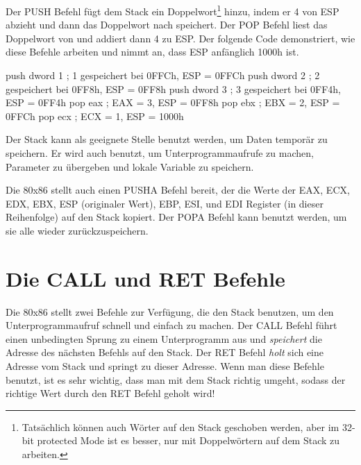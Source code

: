 Der {\code PUSH} Befehl f\"{u}gt dem Stack ein
Doppelwort\footnote{Tats\"{a}chlich k\"{o}nnen auch W\"{o}rter auf den Stack
geschoben werden, aber im 32-bit protected Mode ist es besser, nur
mit Doppelw\"{o}rtern auf dem Stack zu arbeiten.} hinzu, indem er 4 von
ESP abzieht und dann das Doppelwort nach {\code [ESP]} speichert.
Der {\code POP} Befehl liest das Doppelwort von {\code [ESP]} und
addiert dann 4 zu ESP\@. Der folgende Code demonstriert, wie diese
Befehle arbeiten und nimmt an, dass ESP anf\"{a}nglich {\code 1000h}
ist.
\begin{AsmCodeListing}[frame=none, numbers=left]
      push   dword 1        ; 1 gespeichert bei 0FFCh, ESP = 0FFCh
      push   dword 2        ; 2 gespeichert bei 0FF8h, ESP = 0FF8h
      push   dword 3        ; 3 gespeichert bei 0FF4h, ESP = 0FF4h
      pop    eax            ; EAX = 3, ESP = 0FF8h
      pop    ebx            ; EBX = 2, ESP = 0FFCh
      pop    ecx            ; ECX = 1, ESP = 1000h
\end{AsmCodeListing}

Der Stack kann als geeignete Stelle benutzt werden, um Daten
tempor\"{a}r zu speichern. Er wird auch benutzt, um Unterprogrammaufrufe
zu machen, Parameter zu \"{u}bergeben und lokale Variable zu speichern.

Die 80x86 stellt auch einen {\code PUSHA}
 Befehl bereit, der die Werte der EAX,
ECX, EDX, EBX, ESP (originaler Wert), EBP, ESI, und EDI Register (in
dieser Reihenfolge) auf den Stack kopiert. Der {\code POPA}
 Befehl kann benutzt werden, um sie alle
wieder zur\"{u}ckzuspeichern. 

\section{Die {\code CALL} und {\code RET} Befehle }
 

Die 80x86 stellt zwei Befehle zur Verf\"{u}gung, die den Stack benutzen,
um den Unterprogrammaufruf schnell und einfach zu machen. Der {\code
CALL} Befehl f\"{u}hrt einen unbedingten Sprung zu einem Unterprogramm
aus und \emph{speichert} die Adresse des n\"{a}chsten Befehls auf den
Stack. Der {\code RET} Befehl \emph{holt} sich eine Adresse vom
Stack und springt zu dieser Adresse. Wenn man diese Befehle benutzt,
ist es sehr wichtig, dass man mit dem Stack richtig umgeht, sodass
der richtige Wert durch den {\code RET} Befehl geholt wird!

